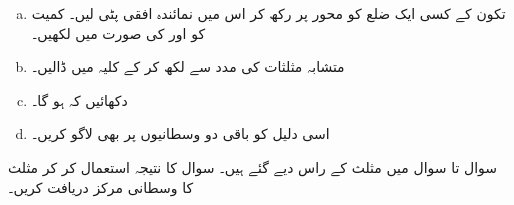 \begin{enumerate}[a.]
\item
تکون کے کسی ایک ضلع کو محور  پر رکھ کر اس میں نمائندہ افقی پٹی  لیں۔ کمیت  کو  اور  کی صورت میں لکھیں۔ 
\item
متشابہ مثلثات کی مدد سے  لکھ کر  کے کلیہ میں ڈالیں۔
\item
دکھائیں کہ  ہو گا۔
\item
اسی دلیل کو باقی دو وسطانیوں پر بھی لاگو کریں۔
\end{enumerate}
سوال  تا سوال  میں  مثلث کے راس دیے گئے ہیں۔ سوال  کا نتیجہ استعمال کر کر مثلث کا وسطانی مرکز دریافت کریں۔

